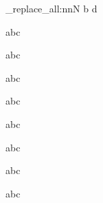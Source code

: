 \documentclass[12pt]{article}
\begin{document}
\ExplSyntaxOn
{} {
	\regex_replace_all:nnN {b} {d} \RWbody
}
\ExplSyntaxOff

abc

abc

\begin{test}
	abc \par
	abc \par
	abc \par
	abc \par
\end{test}

abc

abc
\end{document}

